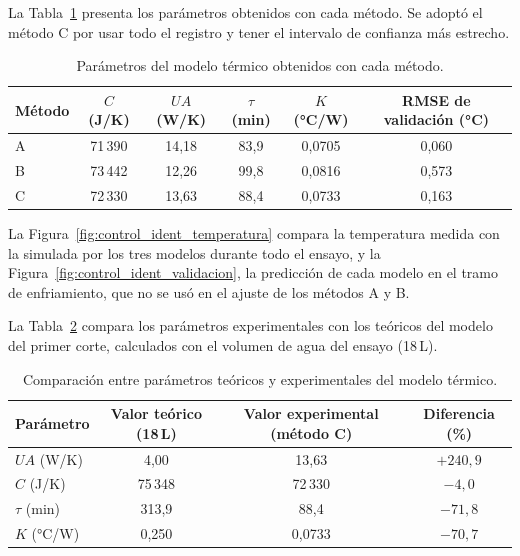 La Tabla~\ref{tab:resultados_metodos} presenta los parámetros obtenidos con cada método. Se adoptó el método C por usar todo el registro y tener el intervalo de confianza más estrecho.

\begin{table}[H]
\centering
\caption{Parámetros del modelo térmico obtenidos con cada método.}
\label{tab:resultados_metodos}
\begin{tabular}{lccccc}
\toprule
Método & $C$ (J/K) & $UA$ (W/K) & $\tau$ (min) & $K$ (°C/W) & RMSE de validación (°C) \\
\midrule
A & 71\,390 & 14,18 & 83,9 & 0,0705 & 0,060 \\
B & 73\,442 & 12,26 & 99,8 & 0,0816 & 0,573 \\
C & 72\,330 & 13,63 & 88,4 & 0,0733 & 0,163 \\
\bottomrule
\end{tabular}
\end{table}

La Figura~\ref{fig:control_ident_temperatura} compara la temperatura medida con la simulada por los tres modelos durante todo el ensayo, y la Figura~\ref{fig:control_ident_validacion}, la predicción de cada modelo en el tramo de enfriamiento, que no se usó en el ajuste de los métodos A y B.



La Tabla~\ref{tab:comparacion_parametros} compara los parámetros experimentales con los teóricos del modelo del primer corte, calculados con el volumen de agua del ensayo (18\,L).

\begin{table}[H]
\centering
\caption{Comparación entre parámetros teóricos y experimentales del modelo térmico.}
\label{tab:comparacion_parametros}
\begin{tabular}{lccc}
\toprule
Parámetro & Valor teórico (18\,L) & Valor experimental (método C) & Diferencia (\%) \\
\midrule
$UA$ (W/K)    & 4,00       & 13,63      & $+240{,}9$ \\
$C$ (J/K)     & 75\,348    & 72\,330    & $-4{,}0$ \\
$\tau$ (min)  & 313,9      & 88,4       & $-71{,}8$ \\
$K$ (°C/W)    & 0,250      & 0,0733     & $-70{,}7$ \\
\bottomrule
\end{tabular}
\end{table}

